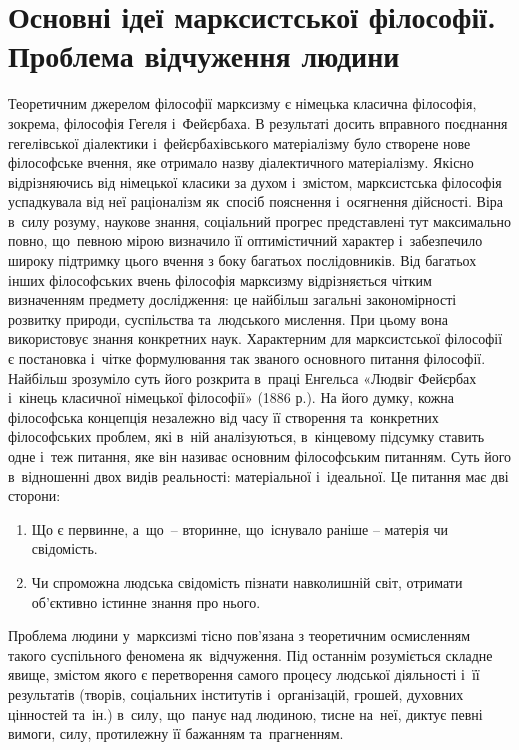 \documentclass[a5paper,oneside,DIV=12,12pt,headings=small]{scrartcl}
\begin{document}
	\section{Основні ідеї марксистської філософії. Проблема відчуження людини}
		Теоретичним джерелом філософії марксизму є німецька класична філософія, зокрема, філософія Гегеля і~Фейєрбаха. В результаті досить вправного поєднання гегелівської діалектики і~фейєрбахівського матеріалізму було створене нове філософське вчення, яке отримало назву діалектичного матеріалізму. Якісно відрізняючись від німецької класики за духом і~змістом, марксистська філософія успадкувала від неї раціоналізм як~спосіб пояснення і~осягнення дійсності. Віра в~силу розуму, наукове знання, соціальний прогрес представлені тут максимально повно, що~певною мірою визначило її оптимістичний характер і~забезпечило широку підтримку цього вчення з боку багатьох послідовників. Від багатьох інших філософських вчень філософія марксизму відрізняється чітким визначенням предмету дослідження: це найбільш загальні закономірності розвитку природи, суспільства та~людського мислення. При цьому вона використовує знання конкретних наук. Характерним для марксистської філософії є постановка і~чітке формулювання так званого основного питання філософії. Найбільш зрозуміло суть його розкрита в~праці Енгельса «Людвіг Фейєрбах і~кінець класичної німецької філософії» (1886 р.). На його думку, кожна філософська концепція незалежно від часу її створення та~конкретних філософських проблем, які в~ній аналізуються, в~кінцевому підсумку ставить одне і~теж питання, яке він називає основним філософським питанням. Суть його в~відношенні двох видів реальності: матеріальної і~ідеальної. Це питання має дві сторони:
		\begin{enumerate}
			\item Що є первинне, а~що~– вторинне, що~існувало раніше – матерія чи свідомість.
			\item Чи спроможна людська свідомість пізнати навколишній світ, отримати об'єктивно істинне знання про нього.
		\end{enumerate}
			
		Проблема людини у~марксизмі тісно пов'язана з теоретичним осмисленням такого суспільного феномена як~відчуження. Під останнім розуміється складне явище, змістом якого є перетворення самого процесу людської діяльності і~її результатів (творів, соціальних інститутів і~організацій, грошей, духовних цінностей та~ін.) в~силу, що~панує над людиною, тисне на~неї, диктує певні вимоги, силу, протилежну її бажанням та~прагненням.
		
\end{document}
